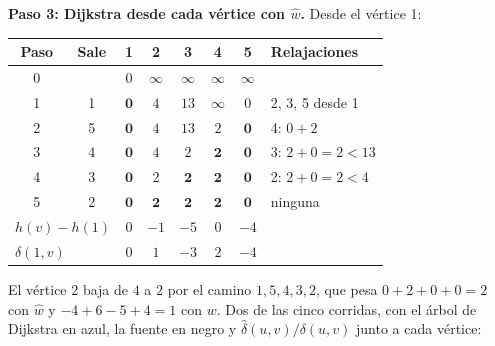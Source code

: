 \documentclass[11pt,letterpaper]{article}
\begin{document}
\begin{ejemplo}
  \textbf{Paso 3: Dijkstra desde cada vértice con $\hat{w}$.} Desde
  el vértice 1:
  \begin{center}
  \small
  \begin{tabular}{cccccccl}
    \toprule
    \textbf{Paso} & \textbf{Sale} & 1 & 2 & 3 & 4 & 5
      & \textbf{Relajaciones} \\
    \midrule
    0 & & $0$ & $\infty$ & $\infty$ & $\infty$ & $\infty$ & \\
    1 & 1 & $\mathbf{0}$ & $4$ & $13$ & $\infty$ & $0$
      & 2, 3, 5 desde 1 \\
    2 & 5 & $\mathbf{0}$ & $4$ & $13$ & $2$ & $\mathbf{0}$
      & 4: $0 + 2$ \\
    3 & 4 & $\mathbf{0}$ & $4$ & $2$ & $\mathbf{2}$ & $\mathbf{0}$
      & 3: $2 + 0 = 2 < 13$ \\
    4 & 3 & $\mathbf{0}$ & $2$ & $\mathbf{2}$ & $\mathbf{2}$
      & $\mathbf{0}$ & 2: $2 + 0 = 2 < 4$ \\
    5 & 2 & $\mathbf{0}$ & $\mathbf{2}$ & $\mathbf{2}$ & $\mathbf{2}$
      & $\mathbf{0}$ & ninguna \\
    \midrule
    \multicolumn{2}{l}{$h(v) - h(1)$} & $0$ & $-1$ & $-5$ & $0$ & $-4$
      & \\
    \multicolumn{2}{l}{$\delta(1, v)$} & $0$ & $1$ & $-3$ & $2$ & $-4$
      & \\
    \bottomrule
  \end{tabular}
  \end{center}
  El vértice 2 baja de $4$ a $2$ por el camino $1, 5, 4, 3, 2$, que
  pesa $0 + 2 + 0 + 0 = 2$ con $\hat{w}$ y $-4 + 6 - 5 + 4 = 1$ con
  $w$. Dos de las cinco corridas, con el árbol de Dijkstra en azul, la
  fuente en negro y $\hat{\delta}(u, v) / \delta(u, v)$ junto a cada
  vértice:
  \begin{center}
\end{center}
\end{ejemplo}
\end{document}

